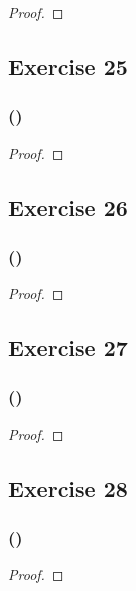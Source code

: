 \documentclass[14pt]{extarticle}
\begin{document}
\begin{proof}

\end{proof}

\subsection{Exercise 25}

\subsubsection{()}

\begin{proof}

\end{proof}

\subsection{Exercise 26}

\subsubsection{()}

\begin{proof}

\end{proof}

\subsection{Exercise 27}

\subsubsection{()}

\begin{proof}

\end{proof}

\subsection{Exercise 28}

\subsubsection{()}

\begin{proof}

\end{proof}
\end{document}
